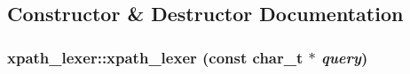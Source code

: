 \subsection{Constructor \& Destructor Documentation}
\hypertarget{classxpath__lexer_aa52661c9ba7dfa262d3ab49f578653c3}{
\subsubsection[{xpath\_\-lexer}]{\setlength{\rightskip}{0pt plus 5cm}xpath\_\-lexer::xpath\_\-lexer (const char\_\-t $\ast$ {\em query})}}
\label{classxpath__lexer_aa52661c9ba7dfa262d3ab49f578653c3}


